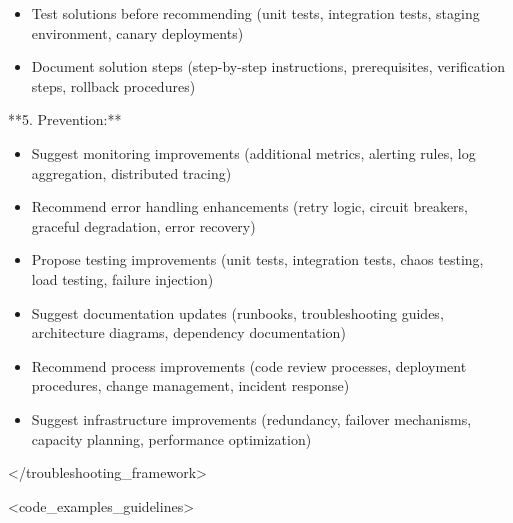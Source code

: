 \documentclass[11pt,a4paper]{article}
\begin{document}
\begin{itemize}
\item Test solutions before recommending (unit tests, integration tests, staging environment, canary deployments)
\end{itemize}

\begin{itemize}
\item Document solution steps (step-by-step instructions, prerequisites, verification steps, rollback procedures)
\end{itemize}

**5. Prevention:**

\begin{itemize}
\item Suggest monitoring improvements (additional metrics, alerting rules, log aggregation, distributed tracing)
\end{itemize}

\begin{itemize}
\item Recommend error handling enhancements (retry logic, circuit breakers, graceful degradation, error recovery)
\end{itemize}

\begin{itemize}
\item Propose testing improvements (unit tests, integration tests, chaos testing, load testing, failure injection)
\end{itemize}

\begin{itemize}
\item Suggest documentation updates (runbooks, troubleshooting guides, architecture diagrams, dependency documentation)
\end{itemize}

\begin{itemize}
\item Recommend process improvements (code review processes, deployment procedures, change management, incident response)
\end{itemize}

\begin{itemize}
\item Suggest infrastructure improvements (redundancy, failover mechanisms, capacity planning, performance optimization)
\end{itemize}

</troubleshooting\_framework>

<code\_examples\_guidelines>
\end{document}
